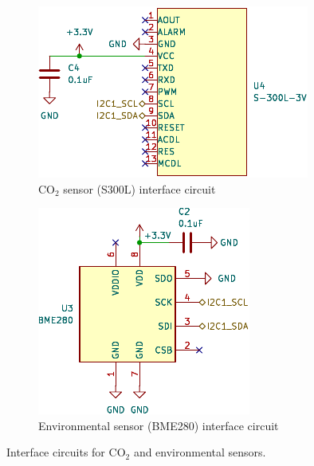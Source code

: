 \documentclass[main]{subfiles}
\begin{document}
\begin{figure}[ht]
    \centering
    \begin{subfigure}[b]{0.48\linewidth}
        \centering
        \includegraphics[width=\linewidth]{figures/2/AGV_Multisensor-CO2_S300L.pdf}
        \caption{CO$_2$ sensor (S300L) interface circuit}
        \label{fig:s300l_circuit}
    \end{subfigure}
    \hfill %
    \begin{subfigure}[b]{0.48\linewidth}
        \centering
        \includegraphics[width=\linewidth]{figures/2/AGV_Multisensor-Env_BME280.pdf}
        \caption{Environmental sensor (BME280) interface circuit}
        \label{fig:bme280_circuit}
    \end{subfigure}
    \caption{Interface circuits for CO$_2$ and environmental sensors.}
    \label{fig:side_by_side_sensors}
\end{figure}

\FloatBarrier
\end{document}
